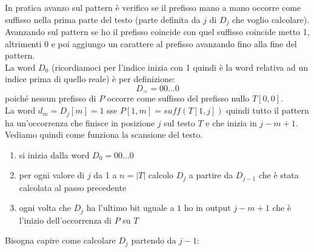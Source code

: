 \documentclass[a4paper,12pt, oneside]{book}
\begin{document}
In pratica avanzo sul pattern è verifico se il prefisso mano a mano occorre come
suffisso nella prima parte del testo (parte definita da $j$ di $D_j$ che voglio
calcolare). Avanzando sul pattern se ho il prefisso coincide con quel suffisso
coincide metto 1, altrimenti 0 e poi aggiungo un carattere al prefisso avanzando
fino alla fine del pattern.\\
La word $D_0$ (ricordiamoci per l'indice inizia con 1 quindi è la word
relativa ad un indice prima di quello reale) è per definizione:
\[D_==00\ldots 0\]
poiché nessun prefisso di $P$ occorre come suffisso del prefisso nullo
$T[0,0]$.\\
La word $d_m=D_j[m]=1$ sse $P[1,m]=suff(T[1,j])$ quindi tutto il pattern ha
un'occorrenza che finisce in posizione $j$ sul testo $T$ e che inizia in
$j-m+1$.\\
Vediamo quindi come funziona la scansione del testo.\\
\begin{enumerate}
  \item si inizia dalla word $D_0=00\ldots0$
  \item per ogni valore di $j$ da 1 a $n=|T|$ calcolo $D_j$ a partire da
  $D_{j-1}$ che è stata calcolata al passo precedente
  \item ogni volta che $D_j$ ha l'ultimo bit uguale a $1$ ho in output $j-m+1$
  che è l'inizio dell'occorrenza di $P$ su $T$
\end{enumerate}
Bisogna capire come calcolare $D_j$ partendo da $j-1$:
\end{document}
